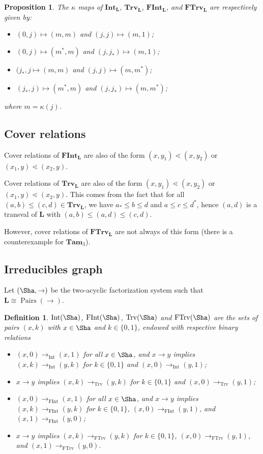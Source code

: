 \documentclass[leqno, 12pt]{amsart}
\numberwithin{equation}{section}
\newcommand{\Tam}{\mathbf{Tam}}
\renewcommand{\L}{\mathbf L}
\newcommand{\Fac}{\mathbf{FInt}}
\newcommand{\Trf}{\mathbf{FTrv}}
\newcommand{\Int}{\mathbf{Int}}
\newcommand{\Trv}{\mathbf{Trv}}
\newcommand{\FacGraph}{{\operatorname{FInt}}}
\newcommand{\TrfGraph}{{\operatorname{FTrv}}}
\newcommand{\IntGraph}{{\operatorname{Int}}}
\newcommand{\TrvGraph}{{\operatorname{Trv}}}
\newcommand{\Pairs}{\operatorname{Pairs}}
\numberwithin{equation}{section}
\newtheorem{prop}[thm]{Proposition}
\newtheorem{defi}[thm]{Definition}
\theoremstyle{remark}
\begin{document}
\begin{prop}
   The $\kappa$ maps of $\Int_\L$, $\Trv_\L$, $\Fac_\L$, and $\Trf_\L$ are respectively given by:
	\begin{itemize}
	\item $(0,j)\mapsto (m,m)$ and $(j,j)\mapsto (m,1)$;
	\item $(0,j)\mapsto(m^*, m)$ and $(j,j_*)\mapsto(m, 1)$;
	\item $(j_*,j\mapsto(m, m)$ and $(j,j)\mapsto(m, m^*)$;
	\item $(j_*,j)\mapsto(m^*, m)$ and $(j,j_*)\mapsto(m , m^*)$;
	\end{itemize}
	where $m=\kappa(j)$.
\end{prop}

\subsection{Cover relations}

Cover relations of $\Fac_\L$ are also of the form $(x,y_1)\lessdot (x,y_2)$ or $(x_1,y)\lessdot (x_2,y)$.

Cover relations of $\Trv_\L$ are also of the form $(x,y_1)\lessdot (x,y_2)$ or $(x_1,y)\lessdot (x_2,y)$. This comes from the fact that for all $(a,b)\le (c,d)\in \Trv_\L$, we have $a_*\le b\le d$ and $a\le c\le d^*$, hence $(a,d)$ is a transval of $\L$ with $(a,b)\le (a,d)\le (c,d)$.

However, cover relations of $\Trf_\L$ are not always of this form (there is a counterexample for $\Tam_3$).
\subsection{Irreducibles graph}

Let $(\Sha, \rightarrow)$ be the two-acyclic factorization system such that $\L \cong \Pairs(\rightarrow)$.

\begin{defi}
  $\IntGraph(\Sha)$,  $\FacGraph(\Sha)$,  $\TrvGraph(\Sha)$ and  $\TrfGraph(\Sha)$ are the sets of pairs $(x,k)$ with $x\in \Sha$ and $k\in \{0,1\}$, endowed with respective binary relations
  \begin{itemize}
  \item $(x,0)\rightarrow_{\IntGraph} (x,1)$ for all $x\in \Sha$, and $x\rightarrow y$ implies $(x,k)\rightarrow_{\IntGraph} (y,k)$ for $k\in \{0,1\}$ and $(x,0)\rightarrow_{\IntGraph} (y,1)$;
  \item $x\rightarrow y$ implies $(x,k)\rightarrow_{\TrvGraph} (y,k)$ for $k\in \{0,1\}$ and $(x,0)\rightarrow_{\TrvGraph} (y,1)$;
  \item $(x,0)\rightarrow_{\FacGraph} (x,1)$ for all $x\in \Sha$, and $x\rightarrow y$ implies $(x,k)\rightarrow_{\FacGraph} (y,k)$ for $k\in \{0,1\}$, $(x,0)\rightarrow_{\FacGraph} (y,1)$, and $(x,1)\rightarrow_{\FacGraph} (y,0)$;
   \item $x\rightarrow y$ implies $(x,k)\rightarrow_{\TrfGraph} (y,k)$ for $k\in \{0,1\}$, $(x,0)\rightarrow_{\TrfGraph} (y,1)$, and $(x,1)\rightarrow_{\TrfGraph} (y,0)$.
  \end{itemize} 
\end{defi}
\end{document}
